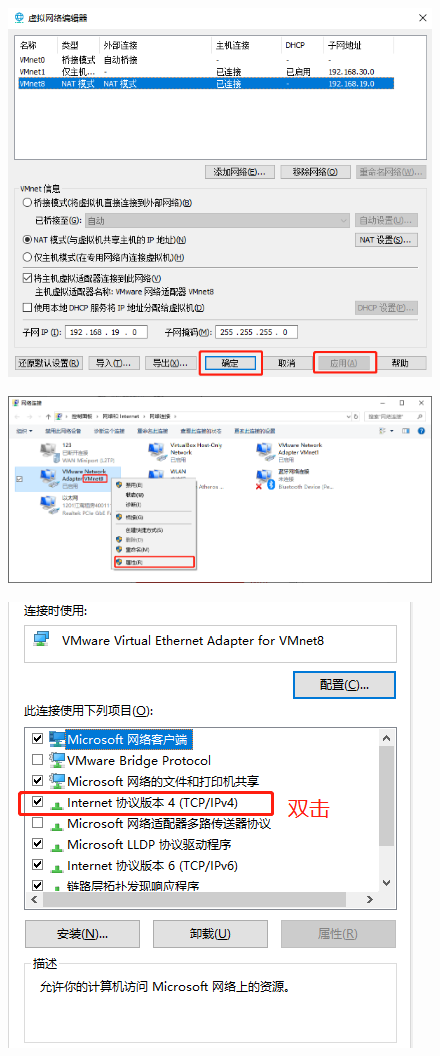 \documentclass[12pt, openany, oneside]{book}
\begin{document}
\begin{figure}[H]
    \centering
    \includegraphics[scale=0.6]{img/C1/1-4/7.png}
\end{figure}

\begin{figure}[H]
    \centering
    \includegraphics[scale=0.4]{img/C1/1-4/8.png}
\end{figure}

\begin{figure}[H]
    \centering
    \includegraphics[scale=0.7]{img/C1/1-4/9.png}
\end{figure}
\end{document}
